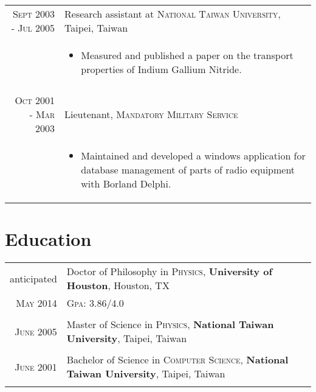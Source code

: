 \documentclass[11pt]{article} %
\begin{document}
\begin{tabular}{r|p{12cm}}
\textsc{Sept 2003 - Jul 2005} & Research assistant at \textsc{National Taiwan University}, Taipei, Taiwan \\
& \small
\begin{itemize}
  \item Measured and published a paper on the transport properties of Indium Gallium Nitride.
\end{itemize}
\\
\multicolumn{2}{c}{} \\


\textsc{Oct 2001 - Mar 2003} & Lieutenant, \textsc{Mandatory Military Service} \\
& \small
\begin{itemize}
  \item Maintained and developed a windows application for database management of parts of radio equipment with Borland Delphi.
\end{itemize}

\end{tabular}


\section{Education}

\begin{tabular}{rl}
anticipated & Doctor of Philosophy in \textsc{Physics}, \textbf{University of Houston}, Houston, TX\\
\textsc{May} 2014 &\normalsize \textsc{Gpa}: 3.86/4.0 \\%
&\\


\textsc{June} 2005 & Master of Science in \textsc{Physics}, \textbf{National Taiwan University}, Taipei, Taiwan \\
&\\


\textsc{June} 2001 & Bachelor of Science in \textsc{Computer Science}, \textbf{National Taiwan University}, Taipei, Taiwan\\
&\\


\end{tabular}
\end{document}
